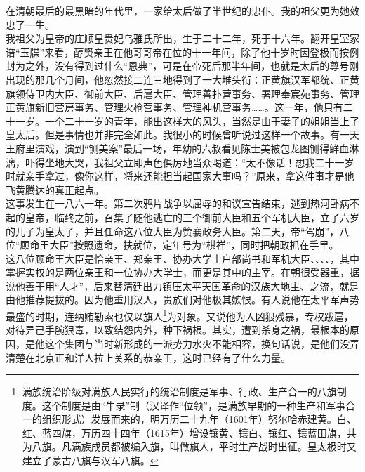   在清朝最后的最黑暗的年代里，一家给太后做了半世纪的忠仆。我的祖父更为她效忠了一生。\\

  我祖父为皇帝的庄顺皇贵妃乌雅氏所出，生于二十二年，死于十六年。翻开皇室家谱“玉牒”来看，醇贤亲王在他哥哥帝在位的十一年间，除了他十岁时因登极而按例封为之外，没有得到过什么“恩典”，可是在帝死后那半年间，也就是太后的尊号刚出现的那几个月间，他忽然接二连三地得到了一大堆头衔：正黄旗汉军都统、正黄旗领侍卫内大臣、御前大臣、后扈大臣、管理善扑营事务、署理奉宸苑事务、管理正黄旗新旧营房事务、管理火枪营事务、管理神机营事务……。这一年，他只有二十一岁。一个二十一岁的青年，能出这样大的风头，当然是由于妻子的姐姐当上了皇太后。但是事情也并非完全如此。我很小的时候曾听说过这样一个故事。有一天王府里演戏，演到“铡美案”最后一场，年幼的六叔看见陈士美被包龙图铡得鲜血淋漓，吓得坐地大哭，我祖父立即声色俱厉地当众喝道：“太不像话！想我二十一岁时就亲手拿过，像你这样，将来还能担当起国家大事吗？”原来，拿这件事才是他飞黄腾达的真正起点。\\

  这事发生在一八六一年。第二次鸦片战争以屈辱的和议宣告结束，逃到热河卧病不起的皇帝，临终之前，召集了随他逃亡的三个御前大臣和五个军机大臣，立了六岁的儿子为皇太子，并且任命这八位大臣为赞襄政务大臣。第二天，帝“驾崩”，八位“顾命王大臣”按照遗命，扶就位，定年号为“棋祥”，同时把朝政抓在手里。\\

  这八位顾命王大臣是恰亲王、郑亲王、协办大学士户部尚书和军机大臣、、、、，其中掌握实权的是两位亲王和一位协办大学士，而更是其中的主宰。在朝很受器重，据说他善于用“人才”，后来替清廷出力镇压太平天国革命的汉族大地主、之流，就是由他推荐提拔的。因为他重用汉人，贵族们对他极其嫉恨。有人说他在太平军声势最盛的时期，连纳贿勒索也仅以旗人\footnote{满族统治阶级对满族人民实行的统治制度是军事、行政、生产合一的八旗制度。这个制度是由“牛录”制（汉译作“位领”，是满族早期的一种生产和军事合一的组织形式）发展而来的，明万历二十九年（1601年）努尔哈赤建黄。白、红、蓝四旗，万历四十四年（1615年）增设镶黄、镶白、镶红、镶蓝田旗，共为八旗。凡满族成员都被编入旗，叫做旗人，平时生产战时出征。皇太极时又建立了蒙古八旗与汉军八旗。}为对象。又说他为人凶狠残暴，专权跋扈，对待异己手腕狠毒，以致结怨内外，种下祸根。其实，遭到杀身之祸，最根本的原因，是他这个集团与当时新形成的一派势力水火不能相容，换句话说，是他们没弄清楚在北京正和洋人拉上关系的恭亲王，这时已经有了什么力量。\\

